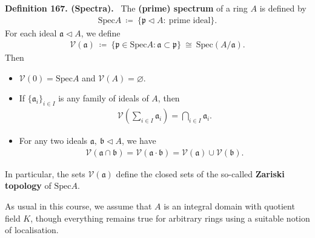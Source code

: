 \documentclass[12pt,a4paper,footinclude=true,headinclude=true]{scrbook} %
\newenvironment{definition}[2][Definition]
    { \begin{mdframed}[backgroundcolor=gray!20] \textbf{#1 #2.}\ }
    {  \end{mdframed}}
\begin{document}
\begin{definition}{167. (Spectra)}
    The \textbf{(prime) spectrum} of a ring $A$ is defined by 
    \begin{align*}
        \mathrm{Spec}A\ \coloneqq\ \{\mathfrak{p}\triangleleft A:\ \text{prime ideal}\}.
    \end{align*}
    For each ideal $\mathfrak{a}\triangleleft A$, we define
    \begin{align*}
        \mathcal{V}(\mathfrak{a})\ \coloneqq\ \{\mathfrak{p}\in\mathrm{Spec}A:\mathfrak{a}\subset\mathfrak{p}\}
        \ \cong\ \mathrm{Spec}(A/\mathfrak{a}).
    \end{align*}
    Then 
    \begin{itemize}
        \item $\mathcal{V}(0)=\mathrm{Spec}A$ and $\mathcal{V}(A)=\varnothing$.
        \item If $\{\mathfrak{a}_i\}_{i\in I}$ is any family of ideals of $A$, then 
        \begin{align*}
            \mathcal{V}(\sum_{i\in I}\mathfrak{a}_i)=\bigcap_{i\in I}\mathfrak{a}_i.
        \end{align*}
        \item For any two ideals $\mathfrak{a},\ \mathfrak{b}\triangleleft A$, we have
        \begin{align*}
            \mathcal{V}(\mathfrak{a}\cap\mathfrak{b})=\mathcal{V}(\mathfrak{a}\cdot\mathfrak{b})=\mathcal{V}(\mathfrak{a})\cup\mathcal{V}(\mathfrak{b}).
        \end{align*}
    \end{itemize}
    In particular, the sets $\mathcal{V}(\mathfrak{a})$ define the closed sets of the so-called \textbf{Zariski topology} of $\mathrm{Spec}A$.
\end{definition}
\newpage
As usual in this course, we assume that $A$ is an integral domain with quotient field $K$, though everything remains true for arbitrary rings using a suitable notion of localisation.
\end{document}
